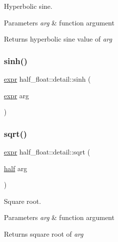 Hyperbolic sine. 
\begin{DoxyParams}{Parameters}
{\em arg} & function argument \\
\hline
\end{DoxyParams}
\begin{DoxyReturn}{Returns}
hyperbolic sine value of {\itshape arg} 
\end{DoxyReturn}
\mbox{\label{namespacehalf__float_1_1detail_ab885f21afbf075b3b3bfe3e028360a4f}} 
\subsubsection{\texorpdfstring{sinh()}{sinh()}\hspace{0.1cm}{\footnotesize\ttfamily [2/2]}}
{\footnotesize\ttfamily \hyperlink{structhalf__float_1_1detail_1_1expr}{expr} half\+\_\+float\+::detail\+::sinh (\begin{DoxyParamCaption}\item[{\hyperlink{structhalf__float_1_1detail_1_1expr}{expr}}]{arg }\end{DoxyParamCaption})\hspace{0.3cm}{\ttfamily [inline]}}

\mbox{\label{namespacehalf__float_1_1detail_af714c124a18db9b79b703007b8d66162}} 
\subsubsection{\texorpdfstring{sqrt()}{sqrt()}\hspace{0.1cm}{\footnotesize\ttfamily [1/2]}}
{\footnotesize\ttfamily \hyperlink{structhalf__float_1_1detail_1_1expr}{expr} half\+\_\+float\+::detail\+::sqrt (\begin{DoxyParamCaption}\item[{\hyperlink{classhalf__float_1_1half}{half}}]{arg }\end{DoxyParamCaption})\hspace{0.3cm}{\ttfamily [inline]}}

Square root. 
\begin{DoxyParams}{Parameters}
{\em arg} & function argument \\
\hline
\end{DoxyParams}
\begin{DoxyReturn}{Returns}
square root of {\itshape arg} 
\end{DoxyReturn}
\mbox{\label{namespacehalf__float_1_1detail_aafd2dced9a16f7e192b0fa7ee1a80b9e}} 
